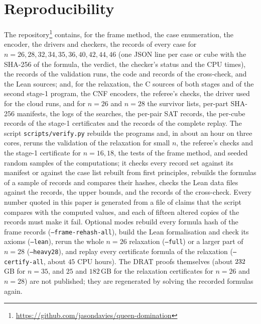 \documentclass[11pt]{article}
\theoremstyle{definition}
\theoremstyle{remark}
\newcommand{\repo}{\url{https://github.com/jasondavies/queen-domination}}
\begin{document}
\section*{Reproducibility}
The repository\footnote{\repo} contains, for the frame method, the case enumeration, the encoder, the
drivers and checkers, the records of every case for $n=26,28,32,34,35,36,40,42,44,46$ (one JSON line per case or
cube with the SHA-256 of the formula, the verdict, the checker's status and the CPU times), the records
of the validation runs, the code and records of the cross-check, and the Lean sources; and, for the
relaxation, the C sources of both stages and of the second stage-1 program, the CNF encoders, the
referee's checks, the driver used for the cloud runs, and for $n=26$ and $n=28$ the survivor lists,
per-part SHA-256 manifests, the logs of the searches, the per-pair SAT records, the per-cube records of
the stage-1 certificates and the records of the complete replay. The script \texttt{scripts/verify.py}
rebuilds the programs and, in about an hour on three cores, reruns the validation of the relaxation for
small $n$, the referee's checks and the stage-1 certificate for $n=16,18$, the tests of the frame
method, and seeded random samples of the computations; it checks every record set against its manifest or
against the case list rebuilt from first principles, rebuilds the formulas of a sample of records and
compares their hashes, checks the Lean data files against the records, the upper bounds, and the
records of the cross-check. Every number quoted in this paper is generated from a file of claims that
the script compares with the computed values, and each of fifteen altered copies of the records must
make it fail. Optional modes rebuild every formula hash of the frame records (\texttt{--frame-rehash-all}),
build the Lean formalisation and check its axioms (\texttt{--lean}), rerun the whole $n=26$ relaxation
(\texttt{--full}) or a larger part of $n=28$ (\texttt{--heavy28}), and replay every certificate formula of
the relaxation (\texttt{--certify-all}, about $45$ CPU hours). The DRAT proofs themselves (about
$232$\,GB for $n=35$, and $25$ and $182$\,GB for the relaxation certificates for $n=26$ and
$n=28$) are not published; they are regenerated by solving the recorded formulas again.
\end{document}
